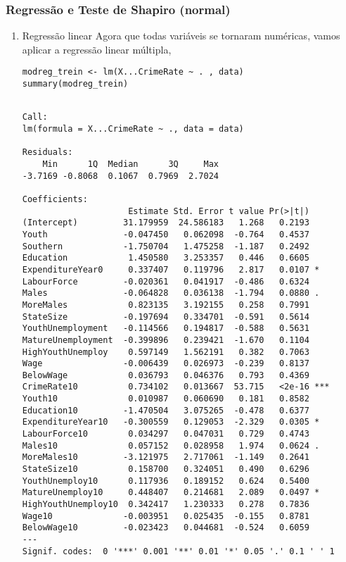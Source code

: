 \documentclass[11pt]{article}
\begin{document}
\subsubsection{Regressão e Teste de Shapiro (normal)}
\label{sec:org8da0a64}
\begin{enumerate}
\item Regressão linear
\label{sec:orged65a6a}
Agora que todas variáveis se tornaram numéricas, vamos aplicar a regressão linear múltipla,

\begin{verbatim}
modreg_trein <- lm(X...CrimeRate ~ . , data)
summary(modreg_trein)
\end{verbatim}

\begin{verbatim}

Call:
lm(formula = X...CrimeRate ~ ., data = data)

Residuals:
    Min      1Q  Median      3Q     Max 
-3.7169 -0.8068  0.1067  0.7969  2.7024 

Coefficients:
                     Estimate Std. Error t value Pr(>|t|)    
(Intercept)         31.179959  24.586183   1.268   0.2193    
Youth               -0.047450   0.062098  -0.764   0.4537    
Southern            -1.750704   1.475258  -1.187   0.2492    
Education            1.450580   3.253357   0.446   0.6605    
ExpenditureYear0     0.337407   0.119796   2.817   0.0107 *  
LabourForce         -0.020361   0.041917  -0.486   0.6324    
Males               -0.064828   0.036138  -1.794   0.0880 .  
MoreMales            0.823135   3.192155   0.258   0.7991    
StateSize           -0.197694   0.334701  -0.591   0.5614    
YouthUnemployment   -0.114566   0.194817  -0.588   0.5631    
MatureUnemployment  -0.399896   0.239421  -1.670   0.1104    
HighYouthUnemploy    0.597149   1.562191   0.382   0.7063    
Wage                -0.006439   0.026973  -0.239   0.8137    
BelowWage            0.036793   0.046376   0.793   0.4369    
CrimeRate10          0.734102   0.013667  53.715   <2e-16 ***
Youth10              0.010987   0.060690   0.181   0.8582    
Education10         -1.470504   3.075265  -0.478   0.6377    
ExpenditureYear10   -0.300559   0.129053  -2.329   0.0305 *  
LabourForce10        0.034297   0.047031   0.729   0.4743    
Males10              0.057152   0.028958   1.974   0.0624 .  
MoreMales10         -3.121975   2.717061  -1.149   0.2641    
StateSize10          0.158700   0.324051   0.490   0.6296    
YouthUnemploy10      0.117936   0.189152   0.624   0.5400    
MatureUnemploy10     0.448407   0.214681   2.089   0.0497 *  
HighYouthUnemploy10  0.342417   1.230333   0.278   0.7836    
Wage10              -0.003951   0.025435  -0.155   0.8781    
BelowWage10         -0.023423   0.044681  -0.524   0.6059    
---
Signif. codes:  0 '***' 0.001 '**' 0.01 '*' 0.05 '.' 0.1 ' ' 1


\end{verbatim}
\end{enumerate}
\end{document}
